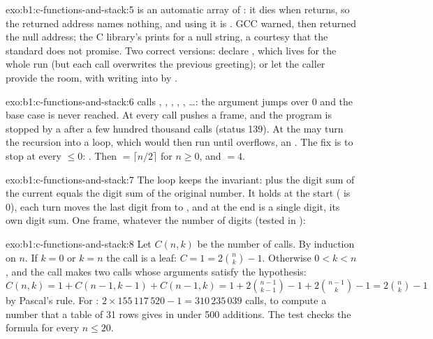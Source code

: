\begin{solution}{exo:b1:c-functions-and-stack:5}
 is an automatic array of : it dies when  returns, so the returned address
names nothing, and using it is . GCC warned, then returned the null address; the C library's
 prints  for a null string, a courtesy that the standard does not promise. Two correct
versions: declare , which lives for the whole run (but each call overwrites the previous
greeting); or let the caller provide the room, with 
writing into  by .
\end{solution}

\begin{solution}{exo:b1:c-functions-and-stack:6}
 calls , , , , , \dots: the
argument jumps over 0 and the base case is never reached. At  every call pushes a frame, and the program
is stopped by a  after a few hundred thousand calls (status 139). At  the  may turn
the recursion into a loop, which would then run until  overflows, an . The fix is to
stop at every  $\leq 0$: . Then  $= \lceil n/2 \rceil$ for
$n \geq 0$, and  $= 4$.
\end{solution}

\begin{solution}{exo:b1:c-functions-and-stack:7}
The loop keeps the invariant:  plus the digit sum of the current  equals the digit sum of the
original number. It holds at the start ( is 0), each turn moves the last digit from  to ,
and at the end  is a single digit, its own digit sum. One frame, whatever the number of digits (tested in
):
\end{solution}

\begin{solution}{exo:b1:c-functions-and-stack:8}
Let $C(n, k)$ be the number of calls. By induction on $n$. If $k = 0$ or $k = n$ the call is a leaf: $C = 1 =
2\binom{n}{k} - 1$. Otherwise $0 < k < n$, and the call makes two calls whose arguments satisfy the hypothesis:
$C(n, k) = 1 + C(n-1, k-1) + C(n-1, k) = 1 + 2\binom{n-1}{k-1} - 1 + 2\binom{n-1}{k} - 1 = 2\binom{n}{k} - 1$ by
Pascal's rule. For : $2 \times 155\,117\,520 - 1 = 310\,235\,039$ calls, to compute a number that
a table of 31 rows gives in under 500 additions. The test  checks the formula for every
$n \leq 20$.
\end{solution}

